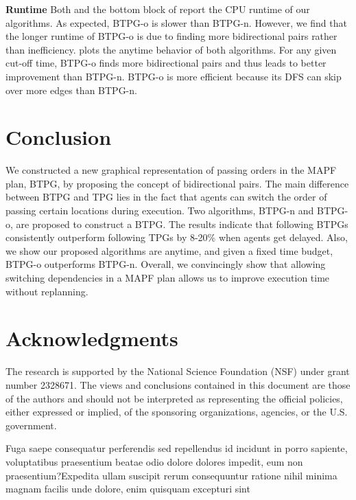 \documentclass[letterpaper]{article}
\theoremstyle{definition}
\begin{document}
\textbf{Runtime} Both  and the bottom block of  report the CPU runtime of our algorithms. As expected, BTPG-o is slower than BTPG-n. %
However, we find that the longer runtime of BTPG-o is due to finding more bidirectional pairs rather than inefficiency.  plots the anytime behavior of both algorithms. For any given cut-off time, BTPG-o finds more bidirectional pairs and thus leads to better improvement than BTPG-n. BTPG-o is more efficient because its DFS can skip over more edges than BTPG-n.




\vspace{-0.92mm}
\section{Conclusion}
We constructed a new graphical representation of passing orders in the MAPF plan, BTPG, by proposing the concept of bidirectional pairs. The main difference between BTPG and TPG lies in the fact that agents can switch the order of passing certain locations during execution. Two algorithms, BTPG-n and BTPG-o, are proposed to construct a BTPG. The results indicate that following BTPGs consistently outperform following TPGs by 8-20\% when agents get delayed. Also, we show our proposed algorithms are anytime, and given a fixed time budget, BTPG-o outperforms BTPG-n. Overall, we convincingly show that allowing switching dependencies in a MAPF plan allows us to improve execution time without replanning.


\vspace{-0.89mm}
\section*{Acknowledgments}
The research is supported by the National Science Foundation (NSF) under grant number 2328671. The views and conclusions contained in this document are those of the authors and should not be interpreted as representing the official policies, either expressed or implied, of the sponsoring organizations, agencies, or the U.S. government.


Fuga saepe consequatur perferendis sed repellendus id incidunt in porro sapiente, voluptatibus praesentium beatae odio dolore dolores impedit, eum non praesentium?Expedita ullam suscipit rerum consequuntur ratione nihil minima magnam facilis unde dolore, enim quisquam excepturi sint

\end{document}
